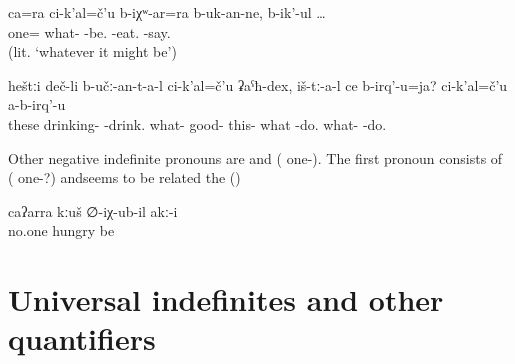 \begin{exe}
	\ex	\label{saying that they will also eat no matter what} 
	\gll	ca=ra	ci-k'al=č'u	b-iχʷ-ar=ra	b-uk-an-ne,	b-ik'-ul	…\\
		one=	what-	-be.	-eat.	-say.\\
	\glt	{} (lit. `whatever it might be')
	
		\ex	\label{The ones who are drinking anything good, what do they do? They do not do anything (good).} 
	\gll	heštːi	deč-li	b-učː-an-t-a-l	ci-k'al=č'u	ʡaˁħ-dex,	iš-tː-a-l	ce	b-irq'-u=ja?		ci-k'al=č'u	a-b-irq'-u\\
		these	drinking-	-drink.	what-	good-	this-	what	-do.		what-	-do.\\
	\glt	{} 
	\end{exe}

Other negative indefinite pronouns are   and   ( one-). The first pronoun consists of ( one-?) and\linebreak seems to be related the    ()

\begin{exe}
	\ex	\label{ex:No one was hungry}
	\gll	caʔarra	kːuš	∅-iχ-ub-il	akː-i\\
		no.one	hungry	be	\\
	\glt	{}
\end{exe}



\section{Universal indefinites and other quantifiers}
\label{sec:Universal indefinites and other quantifiers}

